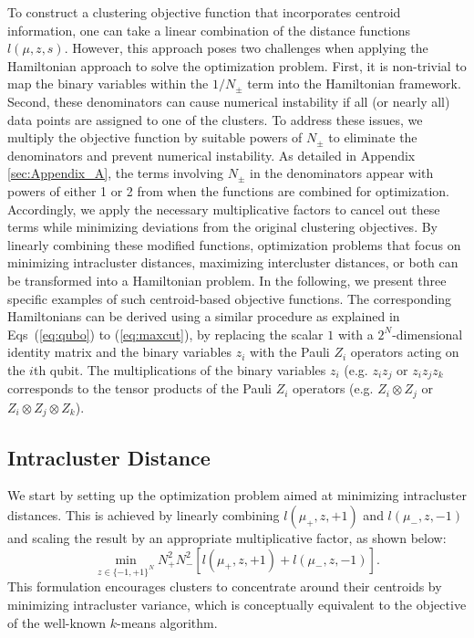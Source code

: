 \documentclass[showpacs,twocolumn,superscriptaddress]{revtex4-2}
\begin{document}
To construct a clustering objective function that incorporates centroid information, one can take a linear combination of the distance functions $l(\mu,z,s)$. However, this approach poses two challenges when applying the Hamiltonian approach to solve the optimization problem. First, it is non-trivial to map the binary variables within the $1/N_{\pm}$ term into the Hamiltonian framework. Second, these denominators can cause numerical instability if all (or nearly all) data points are assigned to one of the clusters.
To address these issues, we multiply the objective function by suitable powers of $N_{\pm}$ to eliminate the denominators and prevent numerical instability. As detailed in Appendix \ref{sec:Appendix_A}, the terms involving $N_{\pm}$ in the denominators appear with powers of either 1 or 2 from when the functions are combined for optimization.
Accordingly, we apply the necessary multiplicative factors to cancel out these terms while minimizing deviations from the original clustering objectives. By linearly combining these modified functions, optimization problems that focus on minimizing intracluster distances, maximizing intercluster distances, or both can be transformed into a Hamiltonian problem.
In the following, we present three specific examples of such centroid-based objective functions. The corresponding Hamiltonians can be derived using a similar procedure as explained in Eqs~(\ref{eq:qubo}) to (\ref{eq:maxcut}), by replacing the scalar $1$ with a $2^N$-dimensional identity matrix and the binary variables $z_i$ with the Pauli $Z_i$ operators acting on the $i$th qubit. The multiplications of the binary variables $z_i$ (e.g. $z_iz_j$ or $z_iz_jz_k$ corresponds to the tensor products of the Pauli $Z_i$ operators (e.g. $Z_i\otimes Z_j$ or $Z_i\otimes Z_j \otimes Z_k$).

\subsection{Intracluster Distance}
\label{sec:intra}
We start by setting up the optimization problem aimed at minimizing intracluster distances. This is achieved by linearly combining $l(\mu_{+},z,+1)$ and $l(\mu_{-},z,-1)$ and scaling the result by an appropriate multiplicative factor, as shown below:
\begin{equation}
    \label{eq:intra}
    \min_{z \in \{-1,+1\}^N}  N_{+}^2N_{-}^2\left[l(\mu_{+},z,+1) + l(\mu_{-},z,-1)\right].    
\end{equation}
This formulation encourages clusters to concentrate around their centroids by minimizing intracluster variance, which is conceptually equivalent to the objective of the well-known $k$-means algorithm.
\end{document}
